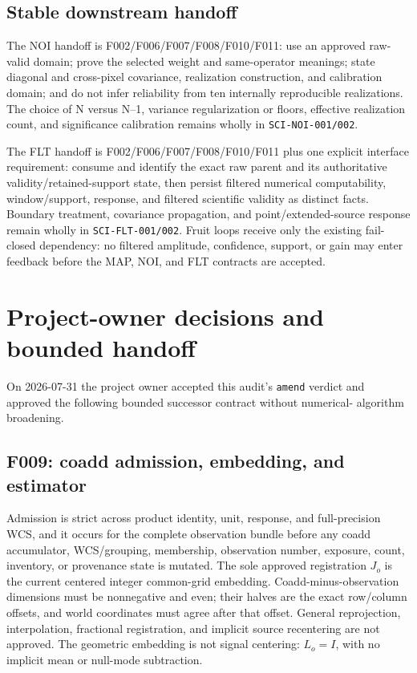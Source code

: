 \documentclass[11pt]{article}
\newcommand{\code}[1]{\nolinkurl{#1}}
\begin{document}
\subsection{Stable downstream handoff}

The NOI handoff is F002/F006/F007/F008/F010/F011: use an approved raw-valid
domain; prove the selected weight and same-operator meanings; state diagonal
and cross-pixel covariance, realization construction, and calibration domain;
and do not infer reliability from ten internally reproducible realizations.
The choice of N versus N--1, variance regularization or floors, effective
realization count, and significance calibration remains wholly in
\code{SCI-NOI-001/002}.

The FLT handoff is F002/F006/F007/F008/F010/F011 plus one explicit interface
requirement: consume and identify the exact raw parent and its authoritative
validity/retained-support state, then persist filtered numerical computability,
window/support, response, and filtered scientific validity as distinct facts.
Boundary treatment, covariance propagation, and point/extended-source response
remain wholly in \code{SCI-FLT-001/002}.  Fruit loops receive only the existing
fail-closed dependency: no filtered amplitude, confidence, support, or gain may
enter feedback before the MAP, NOI, and FLT contracts are accepted.

\section{Project-owner decisions and bounded handoff}
\label{sec:owner-decisions}

On 2026-07-31 the project owner accepted this audit's \texttt{amend} verdict
and approved the following bounded successor contract without numerical-
algorithm broadening.

\subsection{F009: coadd admission, embedding, and estimator}

Admission is strict across product identity, unit, response, and
full-precision WCS, and it occurs for the complete observation bundle before
any coadd accumulator, WCS/grouping, membership, observation number, exposure,
count, inventory, or provenance state is mutated.  The sole approved
registration \(J_o\) is the current centered integer common-grid embedding.
Coadd-minus-observation dimensions must be nonnegative and even; their halves
are the exact row/column offsets, and world coordinates must agree after that
offset.  General reprojection, interpolation, fractional registration, and
implicit source recentering are not approved.  The geometric embedding is not
signal centering: \(L_o=I\), with no implicit mean or null-mode subtraction.
\end{document}
